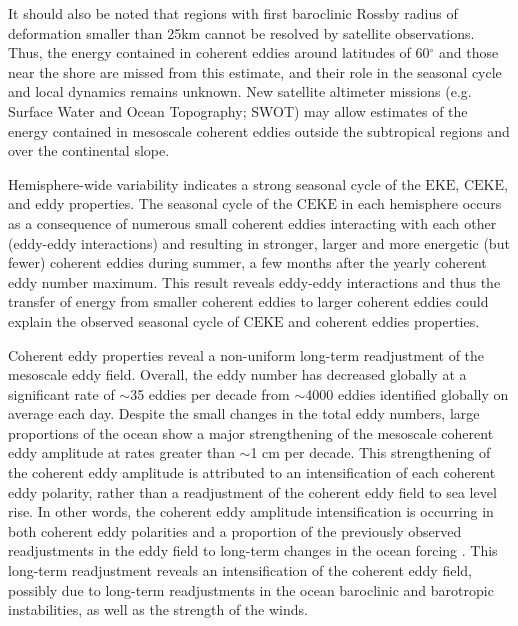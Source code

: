 \documentclass[draft,linenumbers]{agujournal2019}
\newcommand{\EKE}{\textrm{EKE}}
\newcommand{\CEKE}{\textrm{CEKE}}
\begin{document}
	It should also be noted that regions with first baroclinic Rossby radius of deformation smaller than 25km cannot be resolved by satellite observations. 
	Thus, the energy contained in coherent eddies around latitudes of 60$^\circ$ and those near the shore are missed from this estimate, and their role in the seasonal cycle and local dynamics remains unknown. New satellite altimeter missions (e.g. Surface Water and Ocean Topography; SWOT) may allow estimates of the energy contained in mesoscale coherent eddies outside the subtropical regions and over the continental slope.

	Hemisphere-wide variability indicates a strong seasonal cycle of the $\EKE$, $\CEKE$, and eddy properties. 
	The seasonal cycle of the $\CEKE$ in each hemisphere occurs as a consequence of numerous small coherent eddies interacting with each other (eddy-eddy interactions) and resulting in stronger, larger and more energetic (but fewer) coherent eddies during summer, a few months after the yearly coherent eddy number maximum.
	This result reveals eddy-eddy interactions and thus the transfer of energy from smaller coherent eddies to larger coherent eddies could explain the observed seasonal cycle of $\CEKE$ and coherent eddies properties.
	
	Coherent eddy properties reveal a non-uniform long-term readjustment of the mesoscale eddy field. 
	Overall, the eddy number has decreased globally at a significant rate of $\sim$35 eddies per decade from $\sim$4000 eddies identified globally on average each day. Despite the small changes in the total eddy numbers, large proportions of the ocean show a major strengthening of the mesoscale coherent eddy amplitude at rates greater than $\sim$1 cm per decade.
	This strengthening of the coherent eddy amplitude is attributed to an intensification of each coherent eddy polarity, rather than a readjustment of the coherent eddy field to sea level rise. 
	In other words, the coherent eddy amplitude intensification is occurring in both coherent eddy polarities and a proportion of the previously observed readjustments in the eddy field to long-term changes in the ocean forcing \citep{Hu_acceleration_2020,Wunsch_speeding_2020,Martinez_Kinetic_2021}. 
	This long-term readjustment reveals an intensification of the coherent eddy field, possibly due to long-term readjustments in the ocean baroclinic and barotropic instabilities, as well as the strength of the winds.
	
\end{document}
